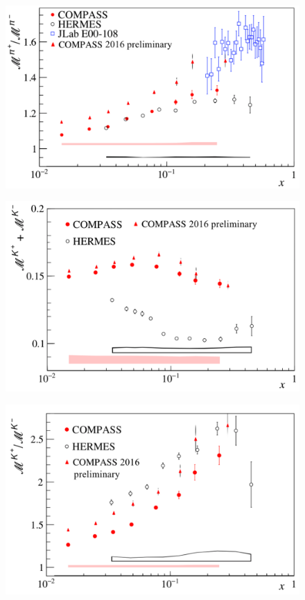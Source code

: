 \documentclass[letterpaper,12pt]{article}
\begin{document}
\begin{figure}[H]
	\includegraphics[scale=0.38]{./gfx/Pir.png}
	\caption{}
	\label{Pir}
\end{figure}

\begin{figure}[H]
	\includegraphics[scale=0.38]{./gfx/Ks.png}
	\caption{}
	\label{Ks}
\end{figure}

\begin{figure}[H]
	\includegraphics[scale=0.38]{./gfx/Kr.png}
	\caption{}
	\label{Kr}
\end{figure}
\end{document}
